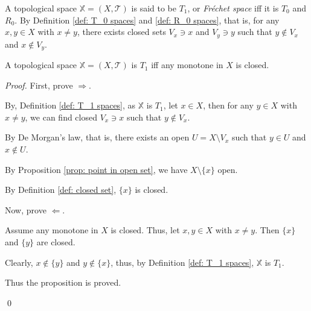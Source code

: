 \begin{definition}
	\label{def: T_1 spaces}
	A topological space $\mathbb X = (X, \mathcal T)$ is said to be $T_1$, or \textit{Fr\'echet space} iff it is $T_0$ and $R_0$. By Definition \ref{def: T_0 spaces} and \ref{def: R_0 spaces}, that is, for any $x,y \in X$ with $x \ne y$, there exists closed sets $V_x \ni x$ and $V_y \ni y$ such that $y \notin V_x$ and $x \notin V_y$.
\end{definition}


\begin{proposition}
	\label{prop: monotone in T_1 is closed}
	A topological space $\mathbb X = (X, \mathcal T)$ is $T_1$ iff any monotone in $X$ is closed.
	
	\begin{proof}
		First, prove $\Rightarrow$.
		
		By, Definition \ref{def: T_1 spaces}, as $\mathbb X$ is $T_1$, let $x \in X$, then for any $y \in X$ with $x \ne y$, we can find closed $V_x \ni x$ such that $y \notin V_x$.
		
		By De Morgan's law, that is, there exists an open $U = X \setminus V_x$ such that $y \in U$ and $x \notin U$.
		
		By Proposition \ref{prop: point in open set}, we have $X \setminus \{x\}$ open.
		
		By Definition \ref{def: closed set}, $\{x\}$ is closed.
		
		\qedlm
		
		Now, prove $\Leftarrow$.
		
		Assume any monotone in $X$ is closed. Thus, let $x, y \in X$ with $x \ne y$. Then $\{x\}$ and $\{y\}$ are closed.
		
		Clearly, $x \notin \{y\}$ and $y \notin \{x\}$, thus, by Definition \ref{def: T_1 spaces}, $\mathbb X$ is $T_1$.
		
		\qedlm
		
		Thus the proposition is proved.
		
		\qed
	\end{proof}
\end{proposition}


